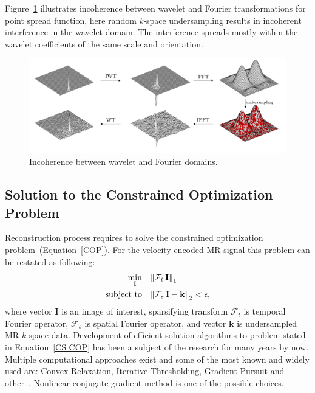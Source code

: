 Figure~\ref{CS1} illustrates incoherence between wavelet and Fourier transformations for point spread function, here random \textit{k-}space undersampling results in incoherent interference in the wavelet domain. 
The interference spreads mostly within the wavelet coefficients of the same scale and orientation. 
\begin{figure}[!htb]
\vspace{+0.2cm}
    \centering
    \includegraphics[width=\textwidth]{Figures/CS1.pdf}
    \caption[Incoherence between wavelet and Fourier domains]{Incoherence between wavelet and Fourier domains.}
    \label{CS1}
\end{figure}
\subsection{Solution to the Constrained Optimization Problem}
Reconstruction process requires to solve the constrained optimization problem~(Equation~\ref{COP}). 
For the velocity encoded MR signal this problem can be restated as following:
\begin{equation} \label{CS COP}
\begin{aligned}
	\min_{\mathbf{I}}  \quad &\norm{\mathcal{F}_t \, \mathbf{I}}_1 \\
	\text{subject to} \quad  &\norm{\mathcal{F}_s \, \mathbf{I}-\mathbf{k}}_2 < \epsilon,
\end{aligned}
\end{equation}
where vector $\mathbf{I}$ is an image of interest, sparsifying transform $\mathcal{F}_t$ is temporal Fourier operator, $\mathcal{F}_s$ is spatial Fourier operator, and vector $\mathbf{k}$ is undersampled MR \mbox{\textit{k-}space} data. 
Development of efficient solution algorithms to problem stated in Equation~\ref{CS COP} has been a subject of the research for many years by now. 
Multiple computational approaches exist and some of the most known and widely used are: Convex Relaxation, Iterative Thresholding, Gradient Pursuit and other~\cite{Qaisar:2013ff}. Nonlinear conjugate gradient method is one of the possible choices.
